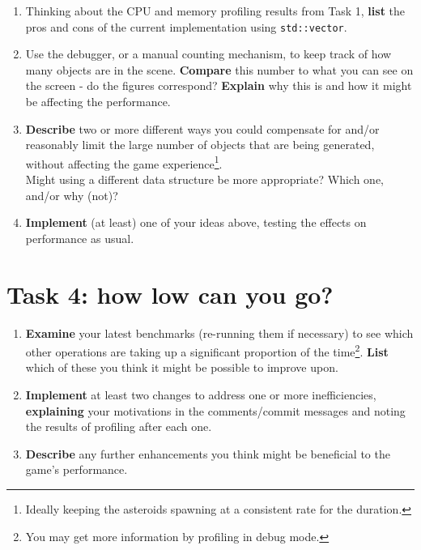 \documentclass{../../../fal_assignment}
\begin{document}
\begin{enumerate}
	\item Thinking about the CPU and memory profiling results from Task 1, \textbf{list} the pros and cons of the current implementation using \lstinline{std::vector}.\\
	\item Use the debugger, or a manual counting mechanism, to keep track of how many objects are in the scene. \textbf{Compare} this number to what you can see on the screen - do the figures correspond? \textbf{Explain} why this is and how it might be affecting the performance.\\
	\item \textbf{Describe} two or more different ways you could compensate for and/or reasonably limit the large number of objects that are being generated, without affecting the game experience\footnote{Ideally keeping the asteroids spawning at a consistent rate for the duration.}.\\
Might using a different data structure be more appropriate? Which one, and/or why (not)?\\
	\item \textbf{Implement} (at least) one of your ideas above, testing the effects on performance as usual.
\end{enumerate}

\section*{Task 4: how low can you go?}

\begin{enumerate}
	\item \textbf{Examine} your latest benchmarks (re-running them if necessary) to see which other operations are taking up a significant proportion of the time\footnote{You may get more information by profiling in debug mode.}. \textbf{List} which of these you think it might be possible to improve upon.\\
	\item \textbf{Implement} at least two changes to address one or more inefficiencies, \textbf{explaining} your motivations in the comments/commit messages and noting the results of profiling after each one.\\
	\item \textbf{Describe} any further enhancements you think might be beneficial to the game's performance.
\end{enumerate}
\end{document}
